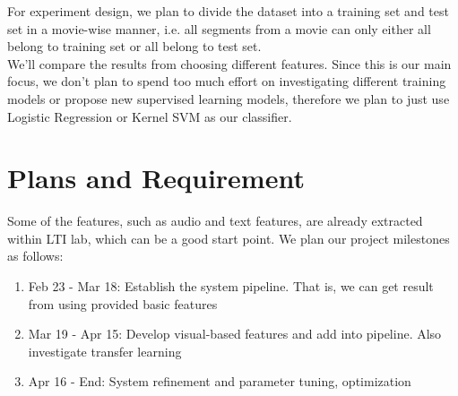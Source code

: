 \documentclass[a4page]{article}
\begin{document}
For experiment design, we plan to divide the dataset into a training set and test set in a movie-wise manner, i.e. all segments from a movie can only either all belong to training set or all belong to test set. \\

We'll compare the results from choosing different features. Since this is our main focus, we don't plan to spend too much effort on investigating different training models or propose new supervised learning models, therefore we plan to just use Logistic Regression or Kernel SVM as our classifier. \\


\section{Plans and Requirement}

Some of the features, such as audio and text features, are already extracted within LTI lab, which can be a good start point. We plan our project milestones as follows:

\begin{enumerate}
\item Feb 23 - Mar 18: Establish the system pipeline. That is, we can get result from using provided basic features
\item Mar 19 - Apr 15: Develop visual-based features and add into pipeline. Also investigate transfer learning
\item Apr 16 - End: System refinement and parameter tuning, optimization
\end{enumerate}




\begin{thebibliography}{10}

\end{thebibliography}
\end{document}
